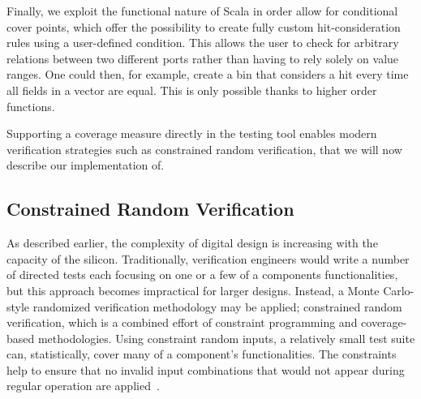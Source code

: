 \documentclass[conference]{IEEEtran}
\newcommand{\hjd}[1]{{\color{pink} Hans: #1}}
\begin{document}
Finally, we exploit the functional nature of Scala in order allow for conditional cover points, which offer the possibility to create fully custom hit-consideration rules using a user-defined condition. This allows the user to check for arbitrary relations between two different ports rather than having to rely solely on value ranges. One could then, for example, create a bin that considers a hit every time all fields in a vector are equal. This is only possible thanks to higher order functions.

Supporting a coverage measure directly in the testing tool enables modern verification strategies such as constrained random verification, that we will now describe our implementation of.

\subsection{Constrained Random Verification}
As described earlier, the complexity of digital design is increasing with the capacity of the silicon. Traditionally, verification engineers would write a number of directed tests each focusing on one or a few of a components functionalities, but this approach becomes impractical for larger designs. Instead, a Monte Carlo-style randomized verification methodology may be applied; constrained random verification, which is a combined effort of constraint programming and coverage-based methodologies. Using constraint random inputs, a relatively small test suite can, statistically, cover many of a component's functionalities. The constraints help to ensure that no invalid input combinations that would not appear during regular operation are applied~\cite{MehtaCRV2018}.


\end{document}
